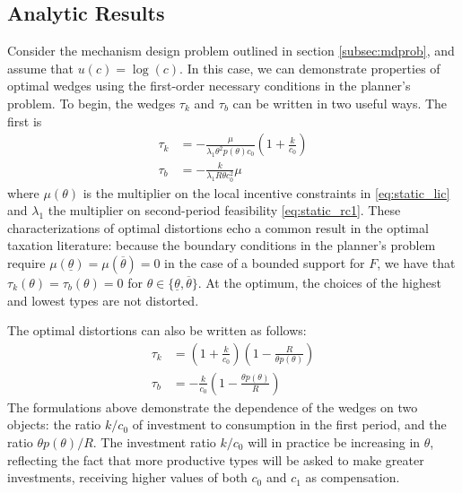 \documentclass[11pt]{article}
\begin{document}
\subsection{Analytic Results} \label{subsec:analytic}

Consider the mechanism design problem outlined in section \ref{subsec:mdprob}, and assume that \( u(c) = \log (c) \). In this case, we can demonstrate properties of optimal wedges using the first-order necessary conditions in the planner's problem. To begin, the wedges \( \tau_k \) and \( \tau_b \) can be written in two useful ways. The first is 
\begin{align}
    \tau_{k}&=-\frac{\mu}{\lambda_{1}\theta^{2}p\left(\theta\right)c_{0}}\left(1+\frac{k}{c_{0}}\right) \label{eq:tkmu} \\
    \tau_{b}&=-\frac{k}{\lambda_{1}R\theta c_{0}^{2}}\mu  \label{eq:tbmu}
\end{align}
where \( \mu(\theta) \) is the multiplier on the local incentive constraints in \eqref{eq:static_lic} and \( \lambda_1 \) the multiplier on second-period feasibility \eqref{eq:static_rc1}. These characterizations of optimal distortions echo a common result in the optimal taxation literature: because the boundary conditions in the planner's problem require \( \mu\left(\underline{\theta}\right)=\mu\left(\overline{\theta}\right)=0 \) in the case of a bounded support for \( F \), we have that \( \tau_k(\theta) = \tau_b(\theta) = 0 \) for \( \theta\in\{\underline{\theta}, \overline{\theta}\} \). At the optimum, the choices of the highest and lowest types are not distorted. 

The optimal distortions can also be written as follows: 
\begin{align}
    \tau_{k}&=\left(1+\frac{k}{c_{0}}\right)\left(1-\frac{R}{\theta p\left(\theta\right)}\right) \label{eq:tauk_tpr} \\
    \tau_{b}&=-\frac{k}{c_{0}}\left(1-\frac{\theta p\left(\theta\right)}{R}\right) \label{eq:taub_tpr} 
\end{align}
The formulations above demonstrate the dependence of the wedges on two objects: the ratio \( k/c_0 \) of investment to consumption in the first period, and the ratio \( \theta p\left( \theta \right)/R \). The investment ratio \( k/c_0 \) will in practice be increasing in \( \theta \), reflecting the fact that more productive types will be asked to make greater investments, receiving higher values of both \( c_0 \) and \( c_1 \) as compensation. 
\end{document}

